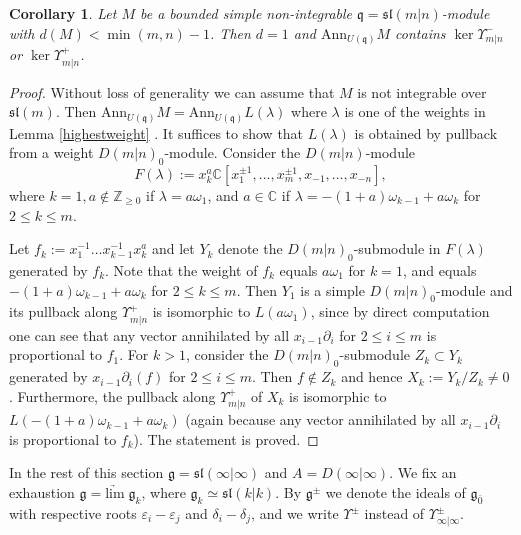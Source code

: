\documentclass[12pt]{amsart}
\makeatletter
\def\@putname#1#2#3#4{\def\@@ref{#3}\let\old@bf\bf
        \def\bf##1{\old@bf\if?\noexpand##1?{#4}\else##1\fi}%
	#1{#2}%
        \let\bf\old@bf}
\def\@putname#1#2#3#4{\def\@@ref{#3}\let\old@bf\bf	%
	\let\old@reset@font\reset@font			%
        \def\bf##1{\old@bf\if?\noexpand##1?{#4}\else##1\fi}%
	\def\reset@font##1##2{\old@reset@font##1\if?\noexpand##2?{#4}\else##2\fi}#1{#2}%
        \let\bf\old@bf\let\reset@font\old@reset@font}
\let\my@ref=\ref
\def\ref#1{\@putname\my@ref{#1}{#1}{\tiny\rm\@@ref}}
\theoremstyle{plain} %
\numberwithin{equation}{section}
\theoremstyle{definition}
\theoremstyle{remark}
\theoremstyle{plain} %
\newtheorem{corollary}[definition]{Corollary}
\renewcommand{\gg}{\mathfrak{g}}
\renewcommand{\sl}{\mathfrak{sl}}
\newcommand{\limarr}{\underrightarrow{\mathrm{lim}} \;}
\newcommand{\Ann}{\mathrm{Ann}}
\newcommand{\C}{\mathbb{C}}
\newcommand{\Z}{\mathbb{Z}}
\def\gg{\mathfrak{g}}
\def\gq{\mathfrak{q}}
\makeatother
\begin{document}
   
   \begin{corollary}\label{impcor} Let $M$ be a bounded simple non-integrable $\gq=\mathfrak{sl}(m|n)$-module with  $d(M)<\min(m,n)-1$. Then $d=1$ and $\Ann_{U(\gq)} M$
     contains $\operatorname{ker}\Upsilon^-_{m|n}$ or $\operatorname{ker}\Upsilon^+_{m|n}$.
   \end{corollary}
   \begin{proof} Without loss of generality we can assume that $M$ is not integrable over $\mathfrak{sl}(m)$. Then 
     $\Ann_{U(\gq)} M=\Ann_{U(\gq)} L(\lambda)$ where $\lambda$ is one of the weights in Lemma \ref{highestweight}. It suffices to show that $L(\lambda)$ is obtained
     by pullback from a weight $D(m|n)_0$-module. Consider the $D(m|n)$-module 
     $$F (\lambda):=x_k^a\mathbb C[x_1^{\pm 1},\dots,x_m^{\pm 1},x_{-1},\dots,x_{-n}],$$
     where $k=1, a \notin \Z_{\geq 0}$  if $\lambda = a\omega_1$, and $a \in \C$ if  $\lambda = -(1+a)\omega_{k-1}+a\omega_k$ for $2\leq k\leq m$. 

     
     

     Let $f_k:=x_1^{-1}\dots x_{k-1}^{-1}x_k^a$ and let $Y_k$ denote the $D(m|n)_0$-submodule in $F  (\lambda)$ generated by $f_k$. Note that the weight of $f_k$
     equals
     $a\omega_1$ for $k=1$, and equals $-(1+a)\omega_{k-1}+a\omega_k$ for $2\leq k\leq m$. Then $Y_1$ is a simple $D(m|n)_0$-module and its
     pullback along $\Upsilon^+_{m|n}$ is isomorphic to $L(a\omega_1)$,  since by direct computation one can see that any vector annihilated by all $x_{i-1}\partial_{i}$ for  $2\leq i\leq m$ is proportional to $f_1$. For $k>1$, consider the $D(m|n)_0$-submodule $Z_k\subset Y_k$ 
     generated by $x_{i-1}\partial_{i}(f)$ for  $2\leq i\leq m$. Then $f\notin Z_k$ and hence $X_k:=Y_k/Z_k\neq 0$. Furthermore, the pullback
     along $\Upsilon^+_{m|n}$ of $X_k$ is
     isomorphic to $L(-(1+a)\omega_{k-1}+a\omega_k)$ (again because any vector annihilated by all $x_{i-1}\partial_{i}$ is proportional to $f_k$).
     The statement is proved.
     \end{proof} 

In the rest of this section $\gg =\sl (\infty | \infty)$ and $A = D(\infty | \infty)$. We fix an exhaustion $\gg = \limarr \gg_k$, where $\gg_k \simeq \sl(k|k)$. By $\gg^{\pm}$ we denote the ideals of $\gg_{\bar{0}}$ with respective roots $\varepsilon_i - \varepsilon_j$ and $\delta_i - \delta_j$, and we write $\Upsilon^\pm$ instead of $\Upsilon^\pm_{\infty | \infty}$. 
\end{document}
